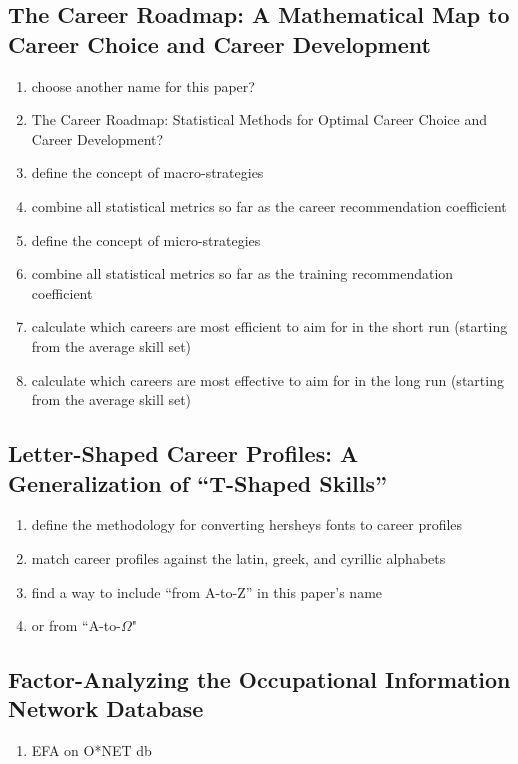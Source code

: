 \documentclass{elsarticle} %
\begin{document}
\subsection{The Career Roadmap: A Mathematical Map to Career Choice and Career Development}
\begin{enumerate}
    \item choose another name for this paper?
    \item The Career Roadmap: Statistical Methods for Optimal Career Choice and Career
          Development?
    \item define the concept of macro-strategies
    \item combine all statistical metrics so far as the career recommendation coefficient
    \item define the concept of micro-strategies
    \item combine all statistical metrics so far as the training recommendation
          coefficient
    \item calculate which careers are most efficient to aim for in the short run
          (starting from the average skill set)
    \item calculate which careers are most effective to aim for in the long run (starting
          from the average skill set)
\end{enumerate}

\subsection{Letter-Shaped Career Profiles: A Generalization of ``T-Shaped Skills''}
\begin{enumerate}
    \item define the methodology for converting hersheys fonts to career profiles
    \item match career profiles against the latin, greek, and cyrillic alphabets
    \item find a way to include ``from A-to-Z'' in this paper's name
    \item or from ``A-to-$\Omega$"
\end{enumerate}

\subsection{Factor-Analyzing the Occupational Information Network Database}
\begin{enumerate}
    \item EFA on O*NET db
\end{enumerate}
\end{document}

